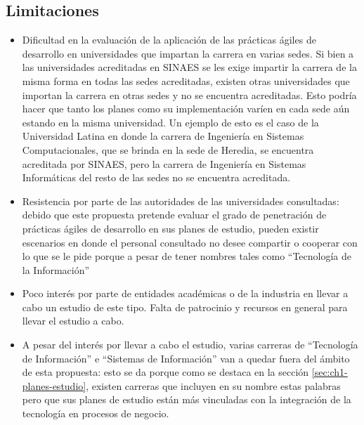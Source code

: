 \subsection{Limitaciones}
\begin{itemize}
    \item Dificultad en la evaluación de la aplicación de las prácticas ágiles de desarrollo en universidades que impartan la carrera en varias sedes. Si bien a las universidades acreditadas en SINAES se les exige impartir la carrera de la misma forma en todas las sedes acreditadas, existen otras universidades que importan la carrera en otras sedes y no se encuentra acreditadas. Esto podría hacer que tanto los planes como su implementación varíen en cada sede aún estando en la misma universidad. Un ejemplo de esto es el caso de la Universidad Latina en donde la carrera de Ingeniería en Sistemas Computacionales, que se brinda en la sede de Heredia, se encuentra acreditada por SINAES, pero la carrera de Ingeniería en Sistemas Informáticas del resto de las sedes no se encuentra acreditada.
    \item Resistencia por parte de las autoridades de las universidades consultadas: debido que este propuesta pretende evaluar el grado de penetración de prácticas ágiles de desarrollo en sus planes de estudio, pueden existir escenarios en donde el personal consultado no desee compartir  o cooperar con lo que se le pide porque a pesar de tener nombres tales como ``Tecnología de la Información'' 
    \item Poco interés por parte de entidades académicas o de la industria en llevar a cabo un estudio de este tipo. Falta de patrocinio y recursos en general para llevar el estudio a cabo. 
    \item A pesar del interés por llevar a cabo el estudio,  varias carreras de ``Tecnología de Información'' e ``Sistemas de Información'' van a quedar fuera del ámbito de esta propuesta: esto se da porque como se destaca en la sección \ref{sec:ch1-planes-estudio}, existen carreras que incluyen en su nombre estas palabras pero que sus planes de estudio están más vinculadas con la integración de la tecnología en procesos de negocio. 
\end{itemize}



